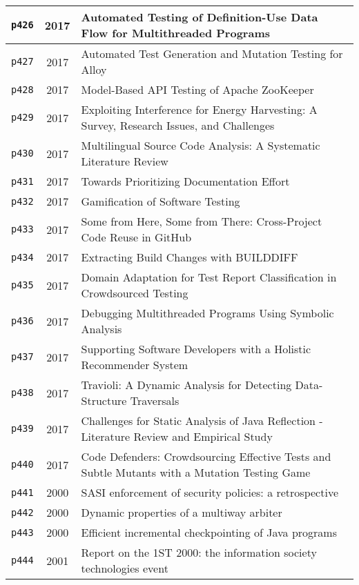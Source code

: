 \begin{longtable}{| c | c | p{16cm} |}
  \hline
  \texttt{p426} & 2017 & Automated Testing of Definition-Use Data Flow for Multithreaded Programs \\
  \hline
  \texttt{p427} & 2017 & Automated Test Generation and Mutation Testing for Alloy \\
  \hline
  \texttt{p428} & 2017 & Model-Based API Testing of Apache ZooKeeper \\
  \hline
  \texttt{p429} & 2017 & Exploiting Interference for Energy Harvesting: A Survey, Research Issues, and Challenges \\
  \hline
  \texttt{p430} & 2017 & Multilingual Source Code Analysis: A Systematic Literature Review \\
  \hline
  \texttt{p431} & 2017 & Towards Prioritizing Documentation Effort \\
  \hline
  \texttt{p432} & 2017 & Gamification of Software Testing \\
  \hline
  \texttt{p433} & 2017 & Some from Here, Some from There: Cross-Project Code Reuse in GitHub \\
  \hline
  \texttt{p434} & 2017 & Extracting Build Changes with BUILDDIFF \\
  \hline
  \texttt{p435} & 2017 & Domain Adaptation for Test Report Classification in Crowdsourced Testing \\
  \hline
  \texttt{p436} & 2017 & Debugging Multithreaded Programs Using Symbolic Analysis \\
  \hline
  \texttt{p437} & 2017 & Supporting Software Developers with a Holistic Recommender System \\
  \hline
  \texttt{p438} & 2017 & Travioli: A Dynamic Analysis for Detecting Data-Structure Traversals \\
  \hline
  \texttt{p439} & 2017 & Challenges for Static Analysis of Java Reflection - Literature Review and Empirical Study \\
  \hline
  \texttt{p440} & 2017 & Code Defenders: Crowdsourcing Effective Tests and Subtle Mutants with a Mutation Testing Game \\
  \hline
  \texttt{p441} & 2000 & SASI enforcement of security policies: a retrospective \\
  \hline
  \texttt{p442} & 2000 & Dynamic properties of a multiway arbiter \\
  \hline
  \texttt{p443} & 2000 & Efficient incremental checkpointing of Java programs \\
  \hline
  \texttt{p444} & 2001 & Report on the 1ST 2000: the information society technologies event \\

\end{longtable}
